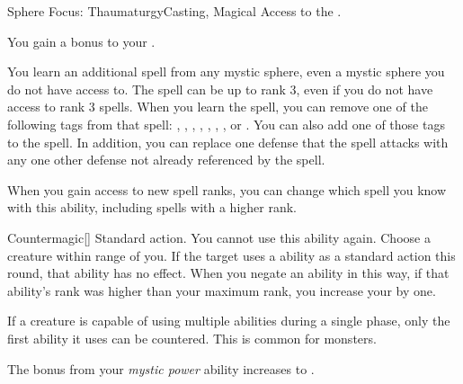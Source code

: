   \begin{magicalfeat}{Sphere Focus: Thaumaturgy}{Casting, Magical}
    \featpre Access to the  .

     You gain a  bonus to your .

     You learn an additional spell from any mystic sphere, even a mystic sphere you do not have access to.
    The spell can be up to rank 3, even if you do not have access to rank 3 spells.
    When you learn the spell, you can remove one of the following tags from that spell: \atAcid, \atAuditory, \atCold, \atCompulsion, \atEmotion, \atElectricity, \atFire, or \atVisual.
    You can also add one of those tags to the spell.
    In addition, you can replace one defense that the spell attacks with any one other defense not already referenced by the spell.

    When you gain access to new spell ranks, you can change which spell you know with this ability, including spells with a higher rank.

    \begin{magicalactiveability}{Countermagic}[]
      \abilityusagetime Standard action.
      \abilitycost You  cannot use this ability again.
      \rankline
      Choose a creature within \rngmed range of you.
      If the target uses a \magical ability as a standard action this round, that ability has no effect.
      When you negate an ability in this way, if that ability's rank was higher than your maximum rank, you increase your  by one.

      If a creature is capable of using multiple abilities during a single phase, only the first ability it uses can be countered.
      This is common for  monsters.
    \end{magicalactiveability}

     The bonus from your \textit{mystic power} ability increases to .
  \end{magicalfeat}

